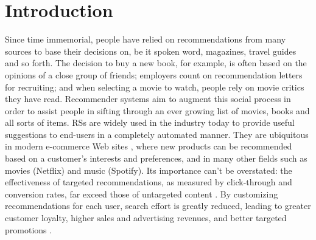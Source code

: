 \documentclass[cic,tc,english]{iiufrgs}
\begin{document}








\chapter{Introduction}
Since time immemorial, people have relied on recommendations from many sources to base their decisions on, be it spoken word, magazines, travel guides and so forth. The decision to buy a new book, for example, is often based on the opinions of a close group of friends; employers count on recommendation letters for recruiting; and when selecting a movie to watch, people rely on movie critics they have read. Recommender systems aim to augment this social process in order to assist people in sifting through an ever growing list of movies, books and all sorts of items. RSs are widely used in the industry today to provide useful suggestions to end-users in a completely automated manner. They are ubiquitous in modern e-commerce Web sites \cite{Schafer2001}, where new products can be recommended based on a customer's interests and preferences, and in many other fields such as movies (Netflix) and music (Spotify). Its importance can't be overstated: the effectiveness of targeted recommendations, as measured by click-through and conversion rates, far exceed those of untargeted content \cite{Linden2003}. By customizing recommendations for each user, search effort is greatly reduced, leading to greater customer loyalty, higher sales and advertising revenues, and better targeted promotions \cite{Ansari2000}.
\end{document}
